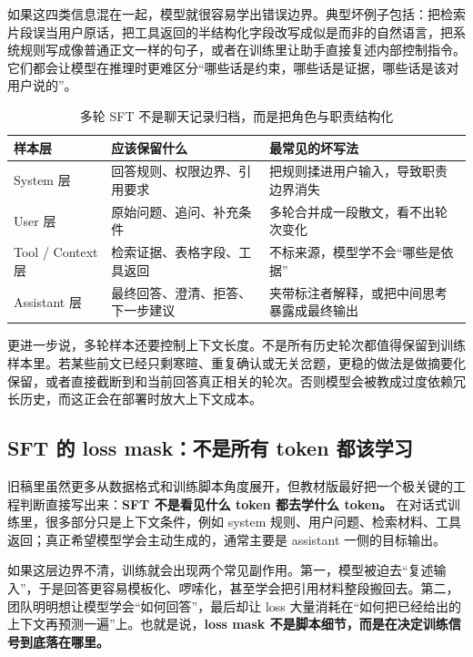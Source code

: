 如果这四类信息混在一起，模型就很容易学出错误边界。典型坏例子包括：把检索片段误当用户原话，把工具返回的半结构化字段改写成似是而非的自然语言，把系统规则写成像普通正文一样的句子，或者在训练里让助手直接复述内部控制指令。它们都会让模型在推理时更难区分“哪些话是约束，哪些话是证据，哪些话是该对用户说的”。

\begin{table}[H]
\centering
\small
\begin{tabularx}{\textwidth}{>{\raggedright\arraybackslash}p{2.8cm}>{\raggedright\arraybackslash}p{3.2cm}>{\raggedright\arraybackslash}X}
\toprule
\textbf{样本层} & \textbf{应该保留什么} & \textbf{最常见的坏写法} \\
\midrule
System 层 & 回答规则、权限边界、引用要求 & 把规则揉进用户输入，导致职责边界消失 \\
User 层 & 原始问题、追问、补充条件 & 多轮合并成一段散文，看不出轮次变化 \\
Tool / Context 层 & 检索证据、表格字段、工具返回 & 不标来源，模型学不会“哪些是依据” \\
Assistant 层 & 最终回答、澄清、拒答、下一步建议 & 夹带标注者解释，或把中间思考暴露成最终输出 \\
\bottomrule
\end{tabularx}
\caption{多轮 SFT 不是聊天记录归档，而是把角色与职责结构化}
\label{tab:multi-turn-sft-structure}
\end{table}

更进一步说，多轮样本还要控制上下文长度。不是所有历史轮次都值得保留到训练样本里。若某些前文已经只剩寒暄、重复确认或无关岔题，更稳的做法是做摘要化保留，或者直接截断到和当前回答真正相关的轮次。否则模型会被教成过度依赖冗长历史，而这正会在部署时放大上下文成本。

\subsection{SFT 的 loss mask：不是所有 token 都该学习}
旧稿里虽然更多从数据格式和训练脚本角度展开，但教材版最好把一个极关键的工程判断直接写出来：\textbf{SFT 不是看见什么 token 都去学什么 token。} 在对话式训练里，很多部分只是上下文条件，例如 system 规则、用户问题、检索材料、工具返回；真正希望模型学会主动生成的，通常主要是 assistant 一侧的目标输出。

如果这层边界不清，训练就会出现两个常见副作用。第一，模型被迫去“复述输入”，于是回答更容易模板化、啰嗦化，甚至学会把引用材料整段搬回去。第二，团队明明想让模型学会“如何回答”，最后却让 loss 大量消耗在“如何把已经给出的上下文再预测一遍”上。也就是说，\textbf{loss mask 不是脚本细节，而是在决定训练信号到底落在哪里。}


